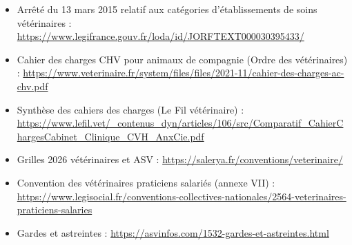 \documentclass[11pt,a4paper]{article}
\begin{document}
\begin{itemize}
  \item Arrêté du 13 mars 2015 relatif aux catégories d'établissements de
    soins vétérinaires :
    \url{https://www.legifrance.gouv.fr/loda/id/JORFTEXT000030395433/}
  \item Cahier des charges CHV pour animaux de compagnie (Ordre des
    vétérinaires) :
    \url{https://www.veterinaire.fr/system/files/files/2021-11/cahier-des-charges-ac-chv.pdf}
  \item Synthèse des cahiers des charges (Le Fil vétérinaire) :
    \url{https://www.lefil.vet/_contenus_dyn/articles/106/src/Comparatif_CahierChargesCabinet_Clinique_CVH_AnxCie.pdf}
  \item Grilles 2026 vétérinaires et ASV : \url{https://salerya.fr/conventions/veterinaire/}
  \item Convention des vétérinaires praticiens salariés (annexe VII) :
    \url{https://www.legisocial.fr/conventions-collectives-nationales/2564-veterinaires-praticiens-salaries}
  \item Gardes et astreintes : \url{https://asvinfos.com/1532-gardes-et-astreintes.html}
\end{itemize}
\end{document}
